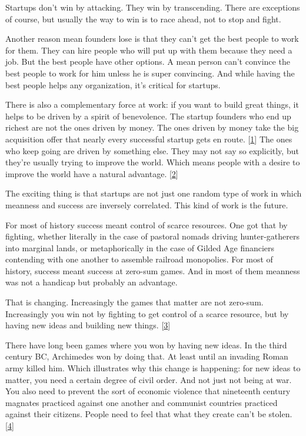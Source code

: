 Startups don't win by attacking. They win by transcending. There
are exceptions of course, but usually the way to win is to race
ahead, not to stop and fight.

Another reason mean founders lose is that they can't get the best
people to work for them. They can hire people who will put up with
them because they need a job. But the best people have other options.
A mean person can't convince the best people to work for him unless
he is super convincing. And while having the best people helps any
organization, it's critical for startups.

There is also a complementary force at work: if you want to build
great things, it helps to be driven by a spirit of benevolence. The startup founders who end up
richest are not the ones driven by money.  The ones driven by money
take the big acquisition offer that nearly every successful startup
gets en route.
[\href{\#f1n}{1}]
The ones who keep going are driven by something
else. They may not say so explicitly, but they're usually trying
to improve the world.  Which means people with a desire to improve
the world have a natural advantage.
[\href{\#f2n}{2}]

The exciting thing is that startups are not just one random type
of work in which meanness and success are inversely correlated.
This kind of work is the future.

For most of history success meant control of scarce resources.  One
got that by fighting, whether literally in the case of pastoral
nomads driving hunter-gatherers into marginal lands, or metaphorically
in the case of Gilded Age financiers contending with one another
to assemble railroad monopolies. For most of history, success meant
success at zero-sum games. And in most of them meanness was not a
handicap but probably an advantage.

That is changing. Increasingly the games that matter are not zero-sum.
Increasingly you win not by fighting to get control of a scarce
resource, but by having new ideas and building new things.
[\href{\#f3n}{3}]

There have long been games where you won by having new ideas. In
the third century BC, Archimedes won by doing that. At least until
an invading Roman army killed him. Which illustrates why
this change is happening: for new ideas to matter, you need a certain
degree of civil order.  And not just not being at war.  You also
need to prevent the sort of economic violence that nineteenth century
magnates practiced against one another and communist countries
practiced against their citizens.  People need to feel that what
they create can't be stolen.
[\href{\#f4n}{4}]

